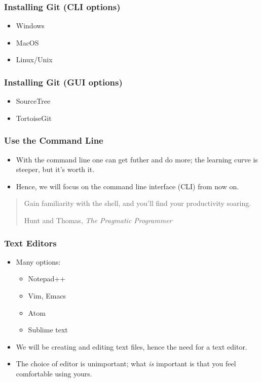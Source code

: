 \documentclass{git_course}
\begin{document}
\begin{frame}
\frametitle{Installing Git (CLI options)}
\begin{itemize}
    \item Windows
    \item MacOS
    \item Linux/Unix
\end{itemize}
\end{frame}

\begin{frame}
\frametitle{Installing Git (GUI options)}
\begin{itemize}
    \item SourceTree
    \item TortoiseGit
\end{itemize}
\end{frame}

\begin{frame}
\frametitle{Use the Command Line}
\begin{itemize}
    \item With the command line one can get futher and do more; the
        learning curve is steeper, but it's worth it.
    \item Hence, we will focus on the command line interface (CLI) from now
        on.
\end{itemize}
    \blockquote[Hunt and Thomas, \emph{The Pragmatic Programmer}]
    {Gain familiarity with the shell, and you'll find your productivity soaring.}
\end{frame}

\begin{frame}
\frametitle{Text Editors}
\begin{itemize}
    \item Many options:
    \begin{itemize}
        \item Notepad++
        \item Vim, Emacs
        \item Atom
        \item Sublime text
    \end{itemize}
    \item We will be creating and editing text files, hence the need for a
        text editor.
    \item The choice of editor is unimportant; what \emph{is} important is
        that you feel comfortable using yours.
\end{itemize}
\end{frame}
\end{document}
